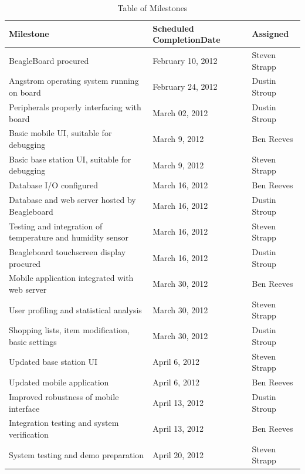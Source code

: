 \documentclass[11pt]{article} %
\begin{document}
\begin{table}[h!]
\caption{Table of Milestones}
\begin{center}
\begin{tabular}{| p{6 cm} | p{4.5 cm} | p{4.5 cm}|}
\hline
\textbf{Milestone} & \textbf{Scheduled Completion\newline Date} & \textbf{Assigned} \\
\hline
BeagleBoard procured & February 10, 2012 & Steven Strapp\\
\hline
Angstrom operating system running on board & February 24, 2012 & Dustin Stroup \\
\hline
Peripherals properly interfacing with board & March 02, 2012 & Dustin Stroup \\
\hline
Basic mobile UI, suitable for debugging & March 9, 2012 & Ben Reeves\\
\hline
Basic base station UI, suitable for debugging & March 9, 2012 & Steven Strapp\\
\hline
Database I/O configured & March 16, 2012 & Ben Reeves \\
\hline
Database and web server hosted by Beagleboard & March 16, 2012 & Dustin Stroup \\
\hline
Testing and integration of temperature and humidity sensor & March 16, 2012 & Steven Strapp \\
\hline
Beagleboard touchscreen display procured & March 16, 2012 & Dustin Stroup \\
\hline
Mobile application integrated with web server & March 30, 2012 & Ben Reeves \\
\hline
User profiling and statistical analysis & March 30, 2012 & Steven Strapp \\
\hline 
Shopping lists, item modification, basic settings & March 30, 2012 & Dustin Stroup \\
\hline
Updated base station UI & April 6, 2012 & Steven Strapp \\
\hline
Updated mobile application & April 6, 2012 & Ben Reeves \\
\hline
Improved robustness of mobile interface& April 13, 2012 & Dustin Stroup \\
\hline
Integration testing and system verification & April 13, 2012 & Ben Reeves \\
\hline
System testing and demo preparation & April 20, 2012 & Steven Strapp \\
\hline
\end{tabular}
\label {MilestoneTable}
\end{center}
\end{table}
\end{document}
